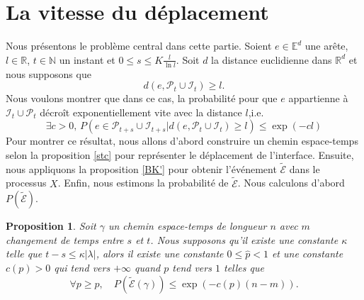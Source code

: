 \documentclass[titlepage,a4paper,12pt]{article}
\newcounter{prop}
\newtheorem{propo}[prop]{Proposition}
\begin{document}
\section{La vitesse du déplacement}
Nous présentons le problème central dans cette partie. Soient $e\in \mathbb{E}^d$ une arête, $l\in \mathbb{R}$, $t\in \mathbb{N}$ un instant et $\displaystyle 0\leqslant s\leqslant K\frac{l}{\ln l}$. Soit $d$ la distance euclidienne dans $\mathbb{R}^d$ et nous supposons que $$d(e,\mathcal{P}_t\cup \mathcal{I}_t) \geqslant l.$$ Nous voulons montrer que dans ce cas, la probabilité pour que $e$ appartienne à $\mathcal{I}_t\cup \mathcal{P}_t$ décroît exponentiellement vite avec la distance $l$,i.e. 
\begin{equation}
\exists c > 0,\, P(e\in \mathcal{P}_{t+s}\cup \mathcal{I}_{t+s}|d(e,\mathcal{P}_t\cup \mathcal{I}_t) \geqslant l)\leqslant \exp(-cl)
\end{equation}
Pour montrer ce résultat, nous allons d'abord construire un chemin espace-temps selon la proposition \ref{stc} pour représenter le déplacement de l'interface. Ensuite, nous appliquons la proposition \ref{BK'} pour obtenir l'événement $\tilde{\mathcal{E}}$ dans le processus $X$. Enfin, nous estimons la probabilité de $\tilde{\mathcal{E}}$. Nous calculons d'abord $P(\tilde{\mathcal{E}})$.
\begin{propo} \label{decexp}
Soit $\gamma$ un chemin espace-temps de longueur $n$ avec $m$ changement de temps entre $s$ et $t$. Nous supposons qu'il existe une constante $\kappa$ telle que $t-s \leqslant \kappa |\lambda|$, alors il existe une constante $0\leqslant\hat{p}< 1$ et une constante $c(p)>0$ qui tend vers $+\infty$ quand $p$ tend vers $1$ telles que $$\forall p \geqslant \hat{p}, \quad P(\tilde{\mathcal{E}}(\gamma))\leqslant \exp(-c(p)(n-m)).$$
\end{propo}
\end{document}
